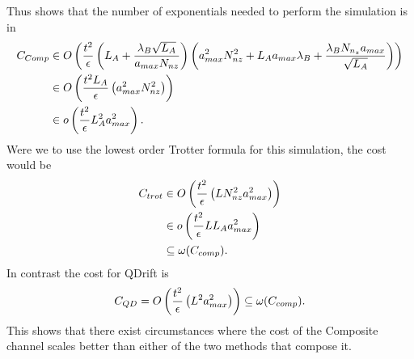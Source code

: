 Thus  shows that the number of exponentials needed to perform the simulation is in
\begin{align}
    C_{Comp}&\in O\left(  \frac{t^2}{\epsilon}\left(L_A+\frac{\lambda_B \sqrt{L_A}}{a_{max} N_{nz} } \right) \left( a_{max}^2 N_{nz}^2 + L_A a_{max} \lambda_B + \frac{\lambda_B N_{n_z} a_{max}}{\sqrt{L_A}}\right)  \right) \nonumber\\
    &\in O\left(  \frac{t^2 L_A}{\epsilon} \left({a_{max}^2 N_{nz}^2}{} \right)  \right) \\
    &\in o\left( \frac{t^2}{\epsilon} L_A^2 a_{max}^2 \right).
\end{align}
Were we to use the lowest order Trotter formula for this simulation, the cost would be
\begin{align}
    C_{trot} &\in O\left( \frac{t^2}{\epsilon} \left(L N_{nz}^2 a_{max}^2 \right)  \right) \\
    &\in o\left( \frac{t^2}{\epsilon} L L_A a_{max}^2 \right) \\
    &\subseteq \omega(C_{comp}).
\end{align}
In contrast the cost for QDrift is
\begin{equation}
    C_{QD} = O\left(  \frac{t^2}{\epsilon} \left({L^2 a_{max}^2} \right)  \right) \subseteq \omega(C_{comp}).
\end{equation}
This shows that there exist circumstances where the cost of the Composite channel scales better than either of the two methods that compose it.



